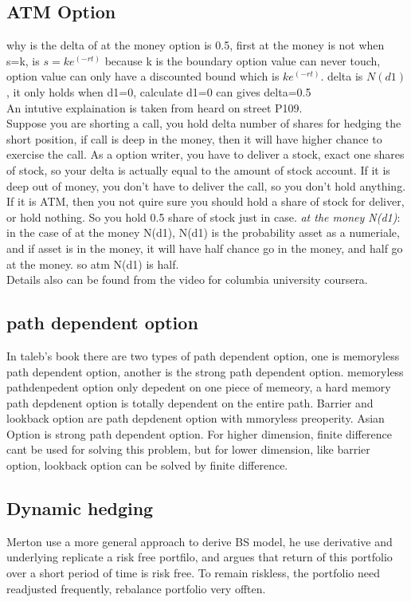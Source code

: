 \documentclass[a4paper,11pt]{article}
\begin{document}
\subsection{ATM Option}
why is the delta of at the money option is 0.5, first at the money is not when s=k, is $s=ke^{(-rt)}$ because k is the boundary option value can never touch, option value can only have a discounted bound which is $ke^{(-rt)}$. delta is $N(d1)$, it only holds when d1=0, calculate d1=0 can gives delta=0.5\\
An intutive explaination is taken from heard on street P109.\\
Suppose you are shorting a call, you hold delta number of shares for hedging the short position, if call is deep in the money, then it will have higher chance to exercise the call. As a option writer, you have to deliver a stock, exact one shares of stock, so your delta is actually equal to the amount of stock account. If it is deep out of money, you don't have to deliver the call, so you don't hold anything. If it is ATM, then you not quire sure you should hold a share of stock for deliver, or hold nothing. So you hold 0.5 share of stock just in case.
{\em  at the money N(d1)}: in the case of at the money N(d1), N(d1) is the probability asset as a numeriale, and if asset is in the money, it will have half chance go in the money, and half go at the money. so atm N(d1) is half.\\ Details also can be found from the video for columbia university coursera.\\
\subsection{path dependent option}
In taleb's book there are two types of path dependent option, one is memoryless path dependent option, another is the strong path dependent option. memoryless pathdenpedent option only depedent on one piece of memeory, a hard memory path depdenent option is totally dependent on the entire path. Barrier and lookback option are path depdenent option with mmoryless preoperity. Asian Option is strong path dependent option. For higher dimension, finite difference cant be used for solving this problem, but for lower dimension, like barrier option, lookback option can be solved by finite difference.

\subsection{Dynamic hedging}
Merton use a more general approach to derive BS model, he use derivative and underlying replicate a risk free portfilo, and argues that return of this portfolio over a short period of time is risk free. To remain riskless, the portfolio need readjusted frequently, rebalance portfolio very offten.\\
\end{document}

